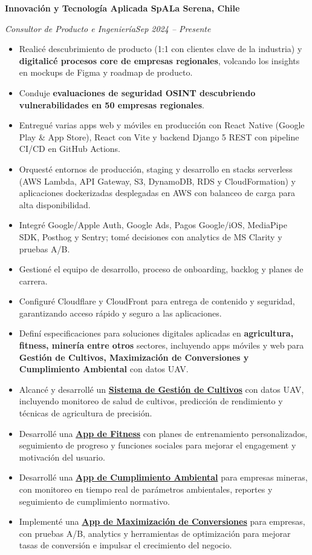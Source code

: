 \documentclass[11pt,a4paper]{article}
\newcommand{\entry}[4]{%
  \textbf{#1}\hfill\textbf{#2}\par
  \textit{#3}\hfill\textit{#4}\par\vspace{2pt}%
}
\begin{document}
\entry{Innovación y Tecnología Aplicada SpA}{La Serena, Chile}{Consultor de Producto e Ingeniería}{Sep 2024 -- Presente}
\begin{itemize}
  \item Realicé descubrimiento de producto (1:1 con clientes clave de la industria) y
        \textbf{digitalicé procesos core de empresas regionales}, volcando los insights en
        mockups de Figma y roadmap de producto.
  \item Conduje \textbf{evaluaciones de seguridad OSINT descubriendo vulnerabilidades en 50
        empresas regionales}.
  \item Entregué varias apps web y móviles en producción con React Native (Google Play \& App
        Store), React con Vite y backend Django 5 REST con pipeline CI/CD en GitHub Actions.
  \item Orquesté entornos de producción, staging y desarrollo en stacks serverless (AWS Lambda,
        API Gateway, S3, DynamoDB, RDS y CloudFormation) y aplicaciones dockerizadas desplegadas
        en AWS con balanceo de carga para alta disponibilidad.
  \item Integré Google/Apple Auth, Google Ads, Pagos Google/iOS, MediaPipe SDK, Posthog y Sentry;
        tomé decisiones con analytics de MS Clarity y pruebas A/B.
  \item Gestioné el equipo de desarrollo, proceso de onboarding, backlog y planes de carrera.
  \item Configuré Cloudflare y CloudFront para entrega de contenido y seguridad, garantizando
        acceso rápido y seguro a las aplicaciones.
  \item Definí especificaciones para soluciones digitales aplicadas en \textbf{agricultura,
        fitness, minería entre otros} sectores, incluyendo apps móviles y web para
        \textbf{Gestión de Cultivos, Maximización de Conversiones y Cumplimiento Ambiental}
        con datos UAV.
  \item Alcancé y desarrollé un \href{https://amissionhub.com}{\textbf{Sistema de Gestión de
        Cultivos}} con datos UAV, incluyendo monitoreo de salud de cultivos, predicción de
        rendimiento y técnicas de agricultura de precisión.
  \item Desarrollé una \href{https://dev.blou.club/}{\textbf{App de Fitness}} con planes de
        entrenamiento personalizados, seguimiento de progreso y funciones sociales para mejorar
        el engagement y motivación del usuario.
  \item Desarrollé una \href{https://chemical2.com/}{\textbf{App de Cumplimiento Ambiental}}
        para empresas mineras, con monitoreo en tiempo real de parámetros ambientales, reportes
        y seguimiento de cumplimiento normativo.
  \item Implementé una \href{https://dev.blou.club/}{\textbf{App de Maximización de
        Conversiones}} para empresas, con pruebas A/B, analytics y herramientas de optimización
        para mejorar tasas de conversión e impulsar el crecimiento del negocio.
\end{itemize}
\end{document}
